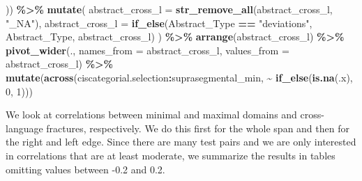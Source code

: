 \documentclass[
]{article}
\newenvironment{Shaded}{\begin{snugshade}}{\end{snugshade}}
\newcommand{\AttributeTok}[1]{\textcolor[rgb]{0.13,0.29,0.53}{#1}}
\newcommand{\DecValTok}[1]{\textcolor[rgb]{0.00,0.00,0.81}{#1}}
\newcommand{\FunctionTok}[1]{\textcolor[rgb]{0.13,0.29,0.53}{\textbf{#1}}}
\newcommand{\NormalTok}[1]{#1}
\newcommand{\SpecialCharTok}[1]{\textcolor[rgb]{0.81,0.36,0.00}{\textbf{#1}}}
\newcommand{\StringTok}[1]{\textcolor[rgb]{0.31,0.60,0.02}{#1}}
\begin{document}
\begin{Shaded}
\begin{Highlighting}[]
\NormalTok{  )) }\SpecialCharTok{\%\textgreater{}\%}
  \FunctionTok{mutate}\NormalTok{(}
    \AttributeTok{abstract\_cross\_l =} \FunctionTok{str\_remove\_all}\NormalTok{(abstract\_cross\_l, }\StringTok{"\_NA"}\NormalTok{),}
    \AttributeTok{abstract\_cross\_l =} \FunctionTok{if\_else}\NormalTok{(Abstract\_Type }\SpecialCharTok{==} \StringTok{"deviations"}\NormalTok{, Abstract\_Type, abstract\_cross\_l)}
\NormalTok{  ) }\SpecialCharTok{\%\textgreater{}\%}
  \FunctionTok{arrange}\NormalTok{(abstract\_cross\_l) }\SpecialCharTok{\%\textgreater{}\%}
  \FunctionTok{pivot\_wider}\NormalTok{(., }\AttributeTok{names\_from =}\NormalTok{ abstract\_cross\_l, }\AttributeTok{values\_from =}\NormalTok{ abstract\_cross\_l) }\SpecialCharTok{\%\textgreater{}\%}
  \FunctionTok{mutate}\NormalTok{(}\FunctionTok{across}\NormalTok{(ciscategorial.selection}\SpecialCharTok{:}\NormalTok{suprasegmental\_min, }\SpecialCharTok{\textasciitilde{}} \FunctionTok{if\_else}\NormalTok{(}\FunctionTok{is.na}\NormalTok{(.x), }\DecValTok{0}\NormalTok{, }\DecValTok{1}\NormalTok{)))}
\end{Highlighting}
\end{Shaded}

We look at correlations between minimal and maximal domains and
cross-language fractures, respectively. We do this first for the whole
span and then for the right and left edge. Since there are many test
pairs and we are only interested in correlations that are at least
moderate, we summarize the results in tables omitting values between
-0.2 and 0.2.
\end{document}
